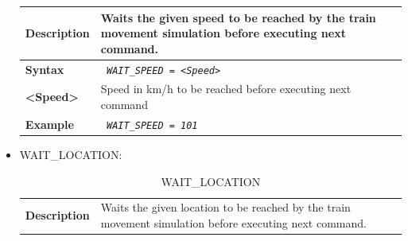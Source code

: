 \begin{itemize}
\begin{longtable}{|l|l|}
			\hline

				\begin{minipage}[t]{0.22\linewidth} \textbf{Description} \end{minipage}
			&	\begin{minipage}[t]{0.78\linewidth} Waits the given speed to be reached by the train movement simulation before executing next command. \end{minipage} \\

			\hline

				\begin{minipage}[t]{0.22\linewidth} \textbf{Syntax}	\end{minipage}
			&	\begin{minipage}[t]{0.78\linewidth} \emph{\texttt{ WAIT\_SPEED = <Speed>}} \end{minipage} \\

			\hline

				\begin{minipage}[t]{0.22\linewidth} \textbf{<Speed>} \end{minipage}
			&	\begin{minipage}[t]{0.78\linewidth} Speed in km/h to be reached before executing next command \end{minipage} \\

			\hline

				\begin{minipage}[t]{0.22\linewidth} \textbf{Example} \end{minipage}
			&	\begin{minipage}[t]{0.78\linewidth}	\emph{\texttt{ WAIT\_SPEED = 101 }} \end{minipage} \\

			\hline\hline

		\end{longtable}

	\item WAIT\_LOCATION:

		\begin{longtable}{|l|l|}
		\caption{WAIT\_LOCATION}\\

			\hline

				\begin{minipage}[t]{0.22\linewidth} \textbf{Description} \end{minipage}
			&	\begin{minipage}[t]{0.78\linewidth} Waits the given location to be reached by the train movement simulation before executing next command. \end{minipage} \\


\end{longtable}
\end{itemize}
